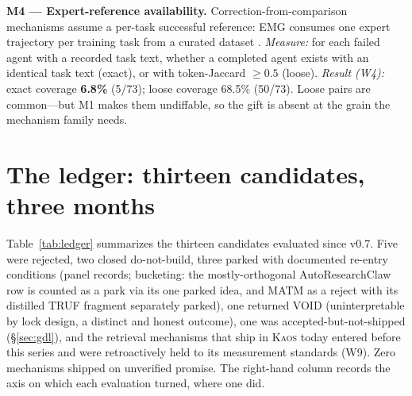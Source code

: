 \documentclass[11pt]{article}
\newcommand{\kaos}{\textsc{Kaos}}
\begin{document}
\textbf{M4 --- Expert-reference availability.} Correction-from-comparison mechanisms assume a per-task successful reference: EMG consumes one expert trajectory per training task from a curated dataset \citep{emg2026}. \emph{Measure:} for each failed agent with a recorded task text, whether a completed agent exists with an identical task text (exact), or with token-Jaccard $\geq 0.5$ (loose). \emph{Result (W4):} exact coverage \textbf{6.8\%} (5/73); loose coverage 68.5\% (50/73). Loose pairs are common---but M1 makes them undiffable, so the gift is absent at the grain the mechanism family needs.

\section{The ledger: thirteen candidates, three months}
\label{sec:ledger}

Table~\ref{tab:ledger} summarizes the thirteen candidates evaluated since v0.7. Five were rejected, two closed do-not-build, three parked with documented re-entry conditions (panel records; bucketing: the mostly-orthogonal AutoResearchClaw row is counted as a park via its one parked idea, and MATM as a reject with its distilled TRUF fragment separately parked), one returned VOID (uninterpretable by lock design, a distinct and honest outcome), one was accepted-but-not-shipped (\S\ref{sec:gdl}), and the retrieval mechanisms that ship in \kaos{} today entered before this series and were retroactively held to its measurement standards (W9). Zero mechanisms shipped on unverified promise. The right-hand column records the axis on which each evaluation turned, where one did.
\end{document}
